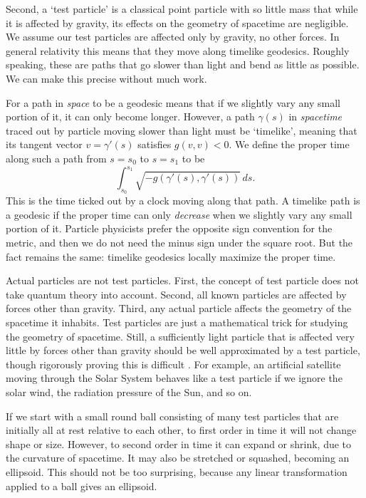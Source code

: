 \documentclass{article}
\begin{document}
Second, a `test particle' is a classical point particle with so little mass that while it is affected by gravity, its effects on the geometry of spacetime are negligible.  We assume our test particles are affected only by gravity, no other forces.   In general relativity this means that they move along timelike geodesics.   Roughly speaking, these are paths that go slower than light and bend as little as possible.   We can make this precise without much work.

For a path in \emph{space} to be a geodesic means that if we slightly vary any small portion of it, it can only become longer.  However, a path $\gamma(s)$ in \emph{spacetime} traced out by particle moving slower than light must be `timelike', meaning that its tangent vector $v = \gamma'(s)$ satisfies $g(v,v) < 0$.   We define the proper time along such a path from $s = s_0$ to $s = s_1$ to be 
\[               \int_{s_0}^{s_1} \sqrt{-g(\gamma'(s),\gamma'(s))} \, ds .\]
This is the time ticked out by a clock moving along that path.   A timelike path is a geodesic if the proper time can only \emph{decrease} when we slightly vary any small portion of it.   Particle physicists prefer the opposite sign convention for the metric, and then we do not need the minus sign under the square root.  But the fact remains the same: timelike geodesics locally maximize the proper time.

Actual particles are not test particles.  First, the concept of test particle does not take quantum theory into account.  Second, all known particles are affected by forces other than gravity.  Third, any actual particle affects the geometry of the spacetime it inhabits.   Test particles are just a mathematical trick for studying the geometry of spacetime.  Still, a sufficiently light particle that is affected very little by forces other than gravity should be well approximated by a test particle, though rigorously proving this is difficult \cite{EIH}.  For example, an artificial satellite moving through the Solar System behaves like a test particle if we ignore the solar wind, the radiation pressure of the Sun, and so on.  
 
If we start with a small round ball consisting of many test particles that are initially all at rest relative to each other, to first order in time it will not change shape or size.  However, to second order in time it can expand or shrink, due to the curvature of spacetime.
It may also be stretched or squashed, becoming an ellipsoid.  This should not be too surprising, because any linear transformation applied to a ball gives an ellipsoid.  
\end{document}
